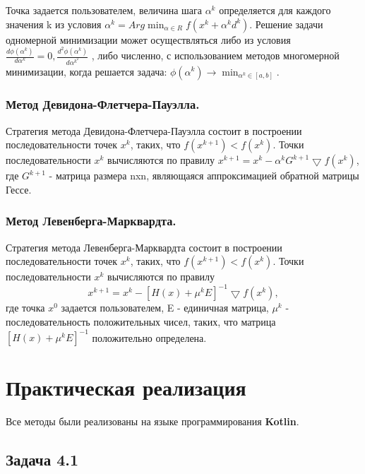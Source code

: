 \documentclass[a4paper, 12pt]{article}   	%
\begin{document}
    Точка  задается пользователем, величина шага $\alpha ^ k$ определяется для каждого значения k из условия $\alpha ^ k = Arg \min_{\alpha \in R} f(x^k + \alpha ^ k d^ k)$. Решение задачи одномерной минимизации может осуществляться либо из условия $\frac{d \phi (\alpha ^k)}{d \alpha ^k} = 0, \frac{d^ 2 \phi (\alpha ^ k)}{d \alpha ^{k ^ 2}}$ , либо численно, с использованием методов многомерной минимизации, когда решается задача:
	$\phi (\alpha ^ k) \rightarrow \min_{\alpha ^ k \in [a, b]}$.

\subsubsection{Метод Девидона-Флетчера-Пауэлла.}
    Стратегия метода Девидона-Флетчера-Пауэлла состоит в построении последовательности точек ${x^k}$, таких, что $f(x^{k+1}) < f(x^k)$. Точки последовательности ${x^k}$ вычисляются по правилу $x^{k+1} = x^k - \alpha ^k G^{k+1} \bigtriangledown f (x^k)$, где $G^{k+1}$ - матрица размера nxn, являющаяся аппроксимацией обратной матрицы Гессе.

\subsubsection{Метод Левенберга-Марквардта.}
    Стратегия метода Левенберга-Марквардта состоит в построении последовательности точек ${x^k}$, таких, что $f(x^{k+1}) < f(x^k)$. Точки последовательности  ${x^k}$ вычисляются по правилу 
    \begin{equation}
        x^{k+1} = x^k - [H(x) + \mu ^k E]^{-1} \bigtriangledown f(x^k),
    \end{equation}
    где  точка $x^0$ задается пользователем, E - единичная матрица, $\mu ^k$ - последовательность положительных чисел, таких, что матрица  $[H(x) + \mu ^k E]^{-1}$ положительно определена. 

\newpage

\section{Практическая реализация}

    Все методы были реализованы на языке программирования \textbf{Kotlin}. 

\subsection{Задача 4.1}
\end{document}
